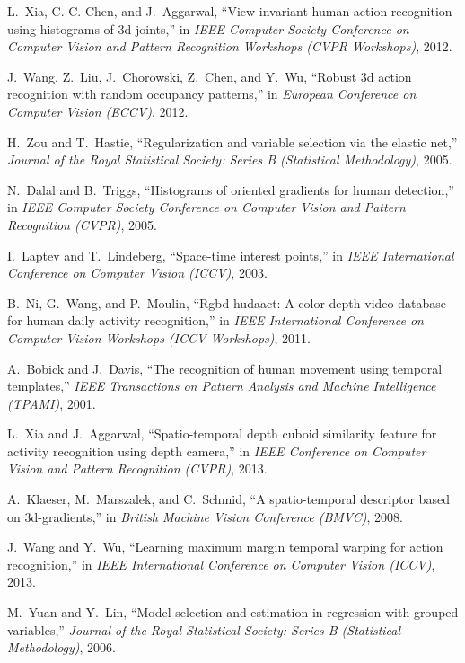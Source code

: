 \documentclass[9pt,technote,compsoc]{IEEEtran}
\begin{document}
\begin{thebibliography}{10}
	L.~Xia, C.-C. Chen, and J.~Aggarwal, ``View invariant human action recognition
	using histograms of 3d joints,'' in \emph{IEEE Computer Society Conference on
		Computer Vision and Pattern Recognition Workshops (CVPR Workshops)}, 2012.
	
	J.~Wang, Z.~Liu, J.~Chorowski, Z.~Chen, and Y.~Wu, ``Robust 3d action
	recognition with random occupancy patterns,'' in \emph{European Conference on
		Computer Vision (ECCV)}, 2012.
	
	H.~Zou and T.~Hastie, ``Regularization and variable selection via the elastic
	net,'' \emph{Journal of the Royal Statistical Society: Series B (Statistical
		Methodology)}, 2005.
	
	N.~Dalal and B.~Triggs, ``Histograms of oriented gradients for human
	detection,'' in \emph{IEEE Computer Society Conference on Computer Vision and
		Pattern Recognition (CVPR)}, 2005.
	
	I.~Laptev and T.~Lindeberg, ``Space-time interest points,'' in \emph{IEEE
		International Conference on Computer Vision (ICCV)}, 2003.
	
	B.~Ni, G.~Wang, and P.~Moulin, ``Rgbd-hudaact: A color-depth video database for
	human daily activity recognition,'' in \emph{IEEE International Conference on
		Computer Vision Workshops (ICCV Workshops)}, 2011.
	
	A.~Bobick and J.~Davis, ``The recognition of human movement using temporal
	templates,'' \emph{IEEE Transactions on Pattern Analysis and Machine
		Intelligence (TPAMI)}, 2001.
	
	L.~Xia and J.~Aggarwal, ``Spatio-temporal depth cuboid similarity feature for
	activity recognition using depth camera,'' in \emph{IEEE Conference on
		Computer Vision and Pattern Recognition (CVPR)}, 2013.
	
	A.~Klaeser, M.~Marszalek, and C.~Schmid, ``A spatio-temporal descriptor based
	on 3d-gradients,'' in \emph{British Machine Vision Conference (BMVC)}, 2008.
	
	J.~Wang and Y.~Wu, ``Learning maximum margin temporal warping for action
	recognition,'' in \emph{IEEE International Conference on Computer Vision
		(ICCV)}, 2013.
	
	M.~Yuan and Y.~Lin, ``Model selection and estimation in regression with grouped
	variables,'' \emph{Journal of the Royal Statistical Society: Series B
		(Statistical Methodology)}, 2006.
	

\end{thebibliography}
\end{document}
